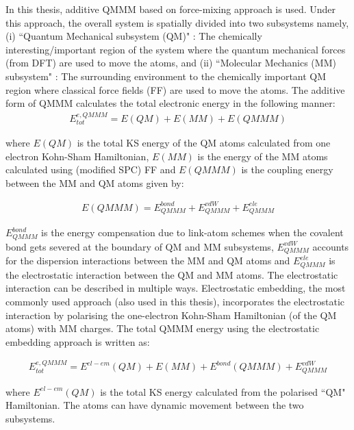 \noindent In this thesis, additive QMMM based on force-mixing approach is used. Under this approach, the overall system is spatially divided into two subsystems namely, (i) ``Quantum Mechanical subsystem (QM)" : The chemically interesting/important region of the system where the quantum mechanical forces (from DFT) are used to move the atoms, and (ii) ``Molecular Mechanics (MM) subsystem" : The surrounding environment to the chemically important QM region where classical force fields (FF) are used to move the atoms. The additive form of QMMM calculates the total electronic energy in the following manner:
\begin{align}
    \label{QMMM-11}
    E_{tot}^{e, QMMM}=E(QM) + E(MM) + E(QMMM)
\end{align}

\noindent where $E(QM)$ is the total KS energy of the QM atoms calculated from one electron Kohn-Sham Hamiltonian,  $E(MM)$  is the energy of the MM atoms calculated using (modified SPC) FF and $E(QMMM)$ is the coupling energy between the MM and QM atoms given by:   

\begin{align}
    \label{QMMM-2}
    E(QMMM)=E^{bond}_{QMMM}+E^{vdW}_{QMMM}+E^{ele}_{QMMM}
\end{align}

\noindent $E^{bond}_{QMMM}$ is the energy compensation due to link-atom schemes\cite{senn2009qm} when the covalent bond gets severed at the boundary of QM and MM subsystems, $E^{vdW}_{QMMM}$ accounts for the dispersion interactions between the MM and QM atoms and $E^{ele}_{QMMM}$ is the electrostatic interaction between the QM and MM atoms. The electrostatic interaction can be described in multiple ways. Electrostatic embedding, the most commonly used approach (also used in this thesis), incorporates the electrostatic interaction by polarising the one-electron Kohn-Sham Hamiltonian (of the QM atoms) with MM charges. The total QMMM energy using the electrostatic embedding approach is written as:

\begin{align}
    \label{QMMM-3}
    E_{tot}^{e, QMMM}=E^{el-em}(QM) + E(MM) + E^{bond}(QMMM) + E^{vdW}_{QMMM}
\end{align}


\noindent where $E^{el-em}(QM)$ is the total KS energy calculated from the polarised ``QM" Hamiltonian. The atoms can have dynamic movement between the two subsystems. %


